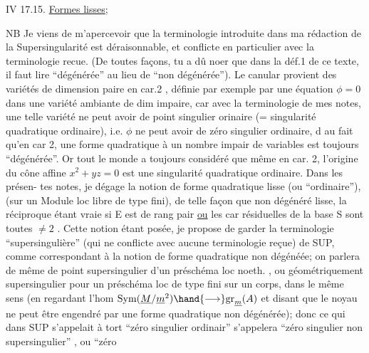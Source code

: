  

IV 17.15. \uline{Formes lisses};  

NB Je viens de m'apercevoir que la terminologie introduite dans
ma rédaction  de la Supersingularité est déraisonnable, et conflicte
en particulier avec la terminologie recue. (De toutes façons, tu a dû
noer que dans la déf.1 de ce texte, il faut lire ``dégénérée'' au lieu de
``non dégénérée''). Le canular provient des variétés de dimension paire
en car.2 ,  définie par exemple par une équation $\phi=0$
dans une variété ambiante de dim impaire, car avec la terminologie de mes
notes, une telle variété ne peut avoir de  point singulier
orinaire (= singularité quadratique ordinaire), i.e. $\phi$ ne peut avoir
de zéro singulier ordinaire, d au fait qu'en car 2, une forme quadratique
à un nombre impair de variables est toujours ``dégénérée''. Or tout le
monde a toujours considéré que même en car. 2, l'origine du cône affine
$x^2 + yz = 0$ est une singularité quadratique ordinaire. Dans les présen-%
tes notes, je dégage la notion de forme quadratique lisse (ou ``ordinaire''),
(sur un Module loc libre de type fini), de telle façon que
non dégénéré \hand{$\Longrightarrow$} lisse, la réciproque étant vraie si E est de rang pair
\uline{ou} les car résiduelles de la base S sont toutes $\neq 2$ . Cette notion étant
posée, je propose de garder la terminologie ``supersingulière'' (qui ne
conflicte avec aucune terminologie reçue)  de SUP,
comme correspondant à la notion de forme quadratique non dégénéée; on
parlera de même de point supersingulier d'un préschéma loc noeth. , ou
géométriquement supersingulier pour un préschéma loc de type fini sur un
corps, dans le même sens (en regardant l'hom $\mathrm{Sym}(\underline{M}/\underline{m}^2) \hand{\longrightarrow} \mathrm{gr}_{\underline{m}}(A)$ et
 disant que le noyau ne peut être engendré par une forme quadratique
non dégénérée); donc ce qui dans SUP s'appelait à tort ``zéro singulier
ordinair'' s'appelera ``zéro singulier non supersingulier'' , ou ``zéro

